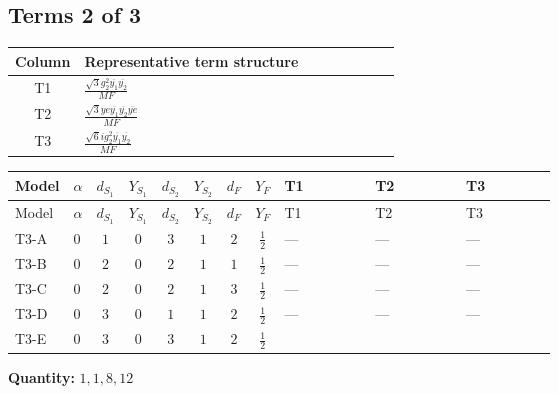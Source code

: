 \documentclass[8pt]{article}
\begin{document}
\begin{landscape}
\subsection*{Terms 2 of 3}
\begin{center}
\begin{tabular}{@{}c >{\raggedright\arraybackslash}p{0.82\linewidth}@{}}
\toprule
Column & Representative term structure \\
\midrule
T1 & \(\displaystyle \frac{\sqrt{3} g_{2}^{2} \overline{y_{1}} \overline{y_{2}}}{MF}\) \\
\midrule
T2 & \(\displaystyle \frac{\sqrt{3} ye \overline{y_{1}} \overline{y_{2}} \overline{ye}}{MF}\) \\
\midrule
T3 & \(\displaystyle \frac{\sqrt{6} i g_{2}^{2} \overline{y_{1}} \overline{y_{2}}}{MF}\) \\
\midrule
\bottomrule
\end{tabular}
\end{center}
\smallskip
\tiny
\begin{longtable}{@{}llcccccc >{\raggedright\arraybackslash}p{0.21\linewidth} >{\raggedright\arraybackslash}p{0.21\linewidth} >{\raggedright\arraybackslash}p{0.21\linewidth}@{}}
\toprule
Model & $\alpha$ & $d_{S_1}$ & $Y_{S_1}$ & $d_{S_2}$ & $Y_{S_2}$ & $d_F$ & $Y_F$ & T1 & T2 & T3 \\
\midrule
\endfirsthead
\toprule
Model & $\alpha$ & $d_{S_1}$ & $Y_{S_1}$ & $d_{S_2}$ & $Y_{S_2}$ & $d_F$ & $Y_F$ & T1 & T2 & T3 \\
\midrule
\endhead
T3-A & $0$ & $1$ & $0$ & $3$ & $1$ & $2$ & $\frac{1}{2}$ & --- & --- & --- \\
\midrule
T3-B & $0$ & $2$ & $0$ & $2$ & $1$ & $1$ & $\frac{1}{2}$ & --- & --- & --- \\
\midrule
T3-C & $0$ & $2$ & $0$ & $2$ & $1$ & $3$ & $\frac{1}{2}$ & --- & --- & --- \\
\midrule
T3-D & $0$ & $3$ & $0$ & $1$ & $1$ & $2$ & $\frac{1}{2}$ & --- & --- & --- \\
\midrule
T3-E & $0$ & $3$ & $0$ & $3$ & $1$ & $2$ & $\frac{1}{2}$ & \scriptsize\adjustbox{max width=\linewidth}{$\begin{gathered} \frac{49 \sqrt{3} g_{2}^{2} \overline{y_{1}} \overline{y_{2}}}{24 MF}\end{gathered}$} & \scriptsize\adjustbox{max width=\linewidth}{$\begin{gathered} - \frac{\sqrt{3} ye \overline{y_{1}} \overline{y_{2}} \overline{ye}}{12 MF}\end{gathered}$} & \scriptsize\adjustbox{max width=\linewidth}{$\begin{gathered} \frac{\sqrt{6} i g_{2}^{2} \overline{y_{1}} \overline{y_{2}}}{3 MF}\end{gathered}$} \\
\midrule
\bottomrule
\end{longtable}
\clearpage
\noindent\textbf{Quantity: }$\mathrm{1,1,8,12}$\par\smallskip

\end{landscape}
\end{document}
